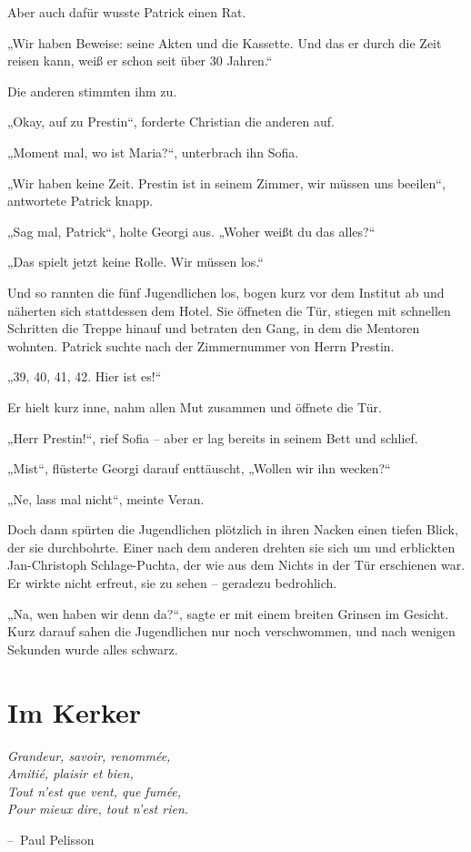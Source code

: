 \documentclass[oneside]{memoir}
\makeatletter
\newenvironment{chapquote}[2][2em]
  {\setlength{\@tempdima}{#1}%
   \def\chapquote@author{#2}%
   \parshape 1 \@tempdima \dimexpr\textwidth-2\@tempdima\relax%
   \itshape}
  {\par\normalfont\hfill--\ \chapquote@author\hspace*{\@tempdima}\par\bigskip}
\makeatother
\begin{document}
Aber auch dafür wusste Patrick einen Rat.

„Wir haben Beweise: seine Akten und die Kassette. Und das er durch die Zeit reisen kann, weiß er schon seit über 30 Jahren.“

Die anderen stimmten ihm zu.

„Okay, auf zu Prestin“, forderte Christian die anderen auf.

„Moment mal, wo ist Maria?“, unterbrach ihn Sofia.

„Wir haben keine Zeit. Prestin ist in seinem Zimmer, wir müssen uns beeilen“, antwortete Patrick knapp.

„Sag mal, Patrick“, holte Georgi aus. „Woher weißt du das alles?“

„Das spielt jetzt keine Rolle. Wir müssen los.“

Und so rannten die fünf Jugendlichen los, bogen kurz vor dem Institut ab und näherten sich stattdessen dem Hotel. Sie öffneten die Tür, stiegen mit schnellen Schritten die Treppe hinauf und betraten den Gang, in dem die Mentoren wohnten. Patrick suchte nach der Zimmernummer von Herrn Prestin.

„39, 40, 41, 42. Hier ist es!“

Er hielt kurz inne, nahm allen Mut zusammen und öffnete die Tür.

„Herr Prestin!“, rief Sofia – aber er lag bereits in seinem Bett und schlief.

„Mist“, flüsterte Georgi darauf enttäuscht, „Wollen wir ihn wecken?“

„Ne, lass mal nicht“, meinte Veran.

Doch dann spürten die Jugendlichen plötzlich in ihren Nacken einen tiefen Blick, der sie durchbohrte. Einer nach dem anderen drehten sie sich um und erblickten Jan-Christoph Schlage-Puchta, der wie aus dem Nichts in der Tür erschienen war. Er wirkte nicht erfreut, sie zu sehen – geradezu bedrohlich.

„Na, wen haben wir denn da?“, sagte er mit einem breiten Grinsen im Gesicht. Kurz darauf sahen die Jugendlichen nur noch verschwommen, und nach wenigen Sekunden wurde alles schwarz.

     
     
\chapter{Im Kerker} %
\begin{chapquote}{Paul Pelisson}
\glqq Grandeur, savoir, renommée, \\
Amitié, plaisir et bien, \\
Tout n’est que vent, que fumée, \\
Pour mieux dire, tout n’est rien.\grqq
\end{chapquote}
\end{document}
